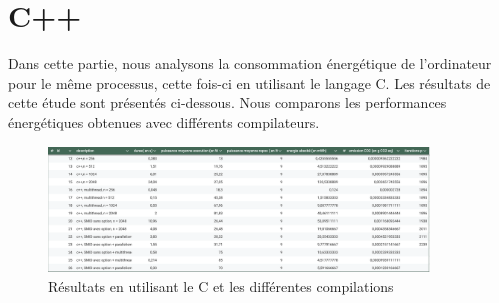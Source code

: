\section{C++}
Dans cette partie, nous analysons la consommation énergétique de l’ordinateur pour le même processus, cette fois-ci en utilisant le langage C. Les résultats de cette étude sont présentés ci-dessous. Nous comparons les performances énergétiques obtenues avec différents compilateurs.

\begin{figure}[h]
    \centering
    \includegraphics[width=0.9\textwidth]{images/tableur4.png}
    \caption{Résultats en utilisant le C et les différentes compilations}
\end{figure}